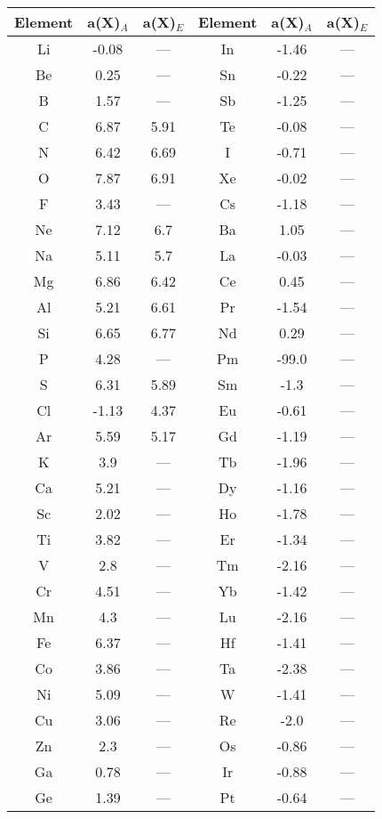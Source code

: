 \begin{table}
  \centering
  \begin{tabular}{c|cc||c|cc}
  \hline
  \hline
  Element & a(X)$_{A}$ & a(X)$_{E}$ & Element & a(X)$_{A}$ & a(X)$_{E}$ \\
  \hline
  Li & -0.08 & --- & In & -1.46 & --- \\
  Be & 0.25 & --- & Sn & -0.22 & --- \\
  B & 1.57 & --- & Sb & -1.25 & --- \\
  C & 6.87 & 5.91 & Te & -0.08 & --- \\
  N & 6.42 & 6.69 & I & -0.71 & --- \\
  O & 7.87 & 6.91 & Xe & -0.02 & --- \\
  F & 3.43 & --- & Cs & -1.18 & --- \\
  Ne & 7.12 & 6.7 & Ba & 1.05 & --- \\
  Na & 5.11 & 5.7 & La & -0.03 & --- \\
  Mg & 6.86 & 6.42 & Ce & 0.45 & --- \\
  Al & 5.21 & 6.61 & Pr & -1.54 & --- \\
  Si & 6.65 & 6.77 & Nd & 0.29 & --- \\
  P & 4.28 & --- & Pm & -99.0 & --- \\
  S & 6.31 & 5.89 & Sm & -1.3 & --- \\
  Cl & -1.13 & 4.37 & Eu & -0.61 & --- \\
  Ar & 5.59 & 5.17 & Gd & -1.19 & --- \\
  K & 3.9 & --- & Tb & -1.96 & --- \\
  Ca & 5.21 & --- & Dy & -1.16 & --- \\
  Sc & 2.02 & --- & Ho & -1.78 & --- \\
  Ti & 3.82 & --- & Er & -1.34 & --- \\
  V & 2.8 & --- & Tm & -2.16 & --- \\
  Cr & 4.51 & --- & Yb & -1.42 & --- \\
  Mn & 4.3 & --- & Lu & -2.16 & --- \\
  Fe & 6.37 & --- & Hf & -1.41 & --- \\
  Co & 3.86 & --- & Ta & -2.38 & --- \\
  Ni & 5.09 & --- & W & -1.41 & --- \\
  Cu & 3.06 & --- & Re & -2.0 & --- \\
  Zn & 2.3 & --- & Os & -0.86 & --- \\
  Ga & 0.78 & --- & Ir & -0.88 & --- \\
  Ge & 1.39 & --- & Pt & -0.64 & --- \\

\end{tabular}
\end{table}
